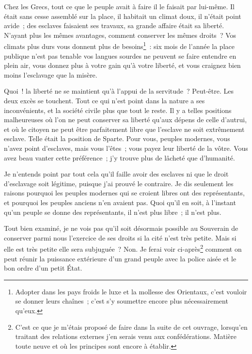\documentclass[french,twoside]{book} %
\begin{document}
Chez les Grecs, tout ce que le peuple avait à faire il le faisait par lui-même. Il était sans cesse assemblé sur la place, il habitait un climat doux, il n’était point avide ; des esclaves faisaient ses travaux, sa grande affaire était sa liberté. N’ayant plus les mêmes avantages, comment conserver les mêmes droits ? Vos climats plus durs vous donnent plus de besoins\footnote{Adopter dans les pays froids le luxe et la mollesse des Orientaux, c’est vouloir se donner leurs chaînes ; c’est s’y soumettre encore plus nécessairement qu’eux.} : six mois de l’année la place publique n’est pas tenable vos langues sourdes ne peuvent se faire entendre en plein air, vous donnez plus à votre gain qu’à votre liberté, et vous craignez bien moins l’esclavage que la misère.\par
Quoi ! la liberté ne se maintient qu’à l’appui de la servitude ? Peut-être. Les deux excès se touchent. Tout ce qui n’est point dans la nature a ses inconvénients, et la société civile plus que tout le reste. Il y a telles positions malheureuses où l’on ne peut conserver sa liberté qu’aux dépens de celle d’autrui, et où le citoyen ne peut être parfaitement libre que l’esclave ne soit extrêmement esclave. Telle était la position de Sparte. Pour vous, peuples modernes, vous n’avez point d’esclaves, mais vous l’êtes ; vous payez leur liberté de la vôtre. Vous avez beau vanter cette préférence ; j’y trouve plus de lâcheté que d’humanité.\par
Je n’entends point par tout cela qu’il faille avoir des esclaves ni que le droit d’esclavage soit légitime, puisque j’ai prouvé le contraire. Je dis seulement les raisons pourquoi les peuples modernes qui se croient libres ont des représentants, et pourquoi les peuples anciens n’en avaient pas. Quoi qu’il en soit, à l’instant qu’un peuple se donne des représentants, il n’est plus libre ; il n’est plus.\par
Tout bien examiné, je ne vois pas qu’il soit désormais possible au Souverain de conserver parmi nous l’exercice de ses droits si la cité n’est très petite. Mais si elle est très petite elle sera subjuguée ? Non. Je ferai voir ci-après\footnote{C’est ce que je m’étais proposé de faire dans la suite de cet ouvrage, lorsqu’en traitant des relations externes j’en serais venu aux confédérations. Matière toute neuve et où les principes sont encore à établir.} comment on peut réunir la puissance extérieure d’un grand peuple avec la police aisée et le bon ordre d’un petit État.
\end{document}
